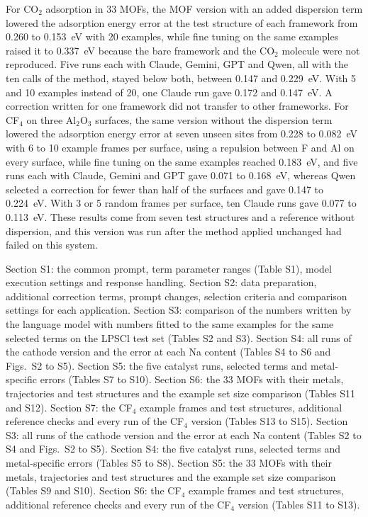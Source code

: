 For CO$_2$ adsorption in 33 MOFs, the MOF version with an added dispersion term lowered the adsorption energy error at the test structure of each framework from 0.260 to 0.153~eV with 20 examples, while fine tuning on the same examples raised it to 0.337~eV because the bare framework and the CO$_2$ molecule were not reproduced. Five runs each with Claude, Gemini, GPT and Qwen, all with the ten calls of the method, stayed below both, between 0.147 and 0.229~eV. With 5 and 10 examples instead of 20, one Claude run gave 0.172 and 0.147~eV. A correction written for one framework did not transfer to other frameworks.
For CF$_4$ on three Al$_2$O$_3$ surfaces, the same version without the dispersion term lowered the adsorption energy error at seven unseen sites from 0.228 to 0.082~eV with 6 to 10 example frames per surface, using a repulsion between F and Al on every surface, while fine tuning on the same examples reached 0.183~eV, and five runs each with Claude, Gemini and GPT gave 0.071 to 0.168~eV, whereas Qwen selected a correction for fewer than half of the surfaces and gave 0.147 to 0.224~eV. With 3 or 5 random frames per surface, ten Claude runs gave 0.077 to 0.113~eV. These results come from seven test structures and a reference without dispersion, and this version was run after the method applied unchanged had failed on this system.

\begin{suppinfo}
Section S1: the common prompt, term parameter ranges (Table S1), model execution settings and response handling. Section S2: data preparation, additional correction terms, prompt changes, selection criteria and comparison settings for each application.
\ifbulk
Section S3: comparison of the numbers written by the language model with numbers fitted to the same examples for the same selected terms on the LPSCl test set (Tables S2 and S3). Section S4: all runs of the cathode version and the error at each Na content (Tables S4 to S6 and Figs.~S2 to S5). Section S5: the five catalyst runs, selected terms and metal-specific errors (Tables S7 to S10). Section S6: the 33 MOFs with their metals, trajectories and test structures and the example set size comparison (Tables S11 and S12). Section S7: the CF$_4$ example frames and test structures, additional reference checks and every run of the CF$_4$ version (Tables S13 to S15).
\else
Section S3: all runs of the cathode version and the error at each Na content (Tables S2 to S4 and Figs.~S2 to S5). Section S4: the five catalyst runs, selected terms and metal-specific errors (Tables S5 to S8). Section S5: the 33 MOFs with their metals, trajectories and test structures and the example set size comparison (Tables S9 and S10). Section S6: the CF$_4$ example frames and test structures, additional reference checks and every run of the CF$_4$ version (Tables S11 to S13).
\fi
\end{suppinfo}




